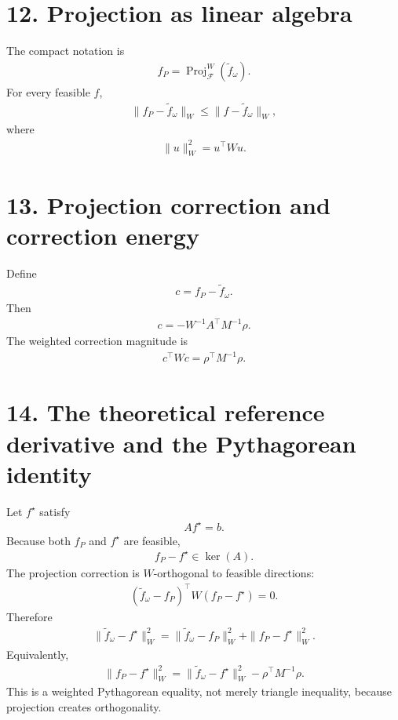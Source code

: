 \documentclass[11pt]{article}
\begin{document}
\section*{12. Projection as linear algebra}

The compact notation is
\begin{align}
\boxed{f_P=\operatorname{Proj}_{\mathcal F}^{W}(\widetilde f_\omega).}
\tag{E5.44}
\end{align}
For every feasible \(f\),
\begin{align}
\boxed{\|f_P-\widetilde f_\omega\|_W\le\|f-\widetilde f_\omega\|_W,}
\tag{E5.45}
\end{align}
where
\begin{align}
\boxed{\|u\|_W^2=u^\top Wu.}
\tag{E5.46}
\end{align}

\section*{13. Projection correction and correction energy}

Define
\begin{align}
\boxed{c=f_P-\widetilde f_\omega.}
\tag{E5.47}
\end{align}
Then
\begin{align}
\boxed{c=-W^{-1}A^\top M^{-1}\rho.}
\tag{E5.48}
\end{align}
The weighted correction magnitude is
\begin{align}
\boxed{c^\top Wc=\rho^\top M^{-1}\rho.}
\tag{E5.49}
\end{align}

\section*{14. The theoretical reference derivative and the Pythagorean identity}

Let \(f^\star\) satisfy
\begin{align}
\boxed{Af^\star=b.}
\tag{E5.50}
\end{align}
Because both \(f_P\) and \(f^\star\) are feasible,
\begin{align}
\boxed{f_P-f^\star\in\ker(A).}
\tag{E5.51}
\end{align}
The projection correction is \(W\)-orthogonal to feasible directions:
\begin{align}
\boxed{(\widetilde f_\omega-f_P)^\top W(f_P-f^\star)=0.}
\tag{E5.52}
\end{align}
Therefore
\begin{align}
\boxed{\|\widetilde f_\omega-f^\star\|_W^2=\|\widetilde f_\omega-f_P\|_W^2+\|f_P-f^\star\|_W^2.}
\tag{E5.53}
\end{align}
Equivalently,
\begin{align}
\boxed{\|f_P-f^\star\|_W^2=\|\widetilde f_\omega-f^\star\|_W^2-\rho^\top M^{-1}\rho.}
\tag{E5.54}
\end{align}
This is a weighted Pythagorean equality, not merely triangle inequality, because projection creates orthogonality.
\end{document}
